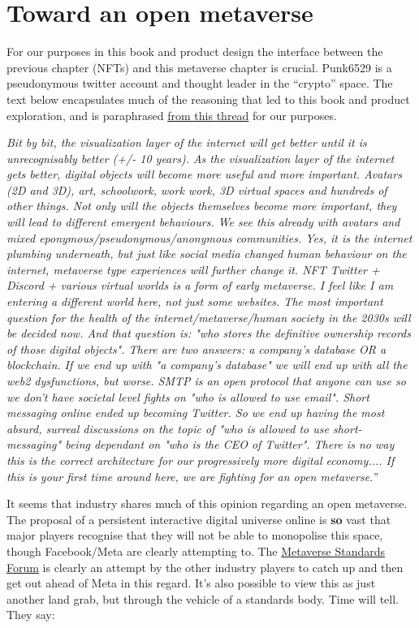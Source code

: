 \section{Toward an open metaverse}
For our purposes in this book and product design the interface between the previous chapter (NFTs) and this metaverse chapter is crucial. Punk6529 is a pseudonymous twitter account and thought leader in the ``crypto'' space. The text below encapsulates much of the reasoning that led to this book and product exploration, and is paraphrased \href{https://twitter.com/punk6529/status/1536046831045685248}{from this thread} for our purposes.\par
\textit{Bit by bit, the visualization layer of the internet will get better until it is unrecognisably better (+/- 10 years). As the visualization layer of the internet gets better, digital objects will become more useful and more important. Avatars (2D and 3D), art, schoolwork, work work, 3D virtual spaces and hundreds of other things. Not only will the objects themselves become more important, they will lead to different emergent behaviours. We see this already with avatars and mixed eponymous/pseudonymous/anonymous communities. Yes, it is the internet plumbing underneath, but just like social media changed human behaviour on the internet, metaverse type experiences will further change it. NFT Twitter + Discord + various virtual worlds is a form of early metaverse. I feel like I am entering a different world here, not just some websites. The most important question for the health of the internet/metaverse/human society in the 2030s will be decided now. And that question is: "who stores the definitive ownership records of those digital objects". There are two answers: a company's database OR a blockchain. If we end up with "a company's database" we will end up with all the web2 dysfunctions, but worse. SMTP is an open protocol that anyone can use so we don't have societal level fights on "who is allowed to use email". Short messaging online ended up becoming Twitter. So we end up having the most absurd, surreal discussions on the topic of "who is allowed to use short-messaging" being dependant on "who is the CEO of Twitter". There is no way this is the correct architecture for our progressively more digital economy.... If this is your first time around here, we are fighting for an open metaverse.''}\par
It seems that industry shares much of this opinion regarding an open metaverse. The proposal of a persistent interactive digital universe online is \textbf{so} vast that major players recognise that they will not be able to monopolise this space, though Facebook/Meta are clearly attempting to. The \href{https://metaverse-standards.org/news/press-releases/leading-standards-organizations-and-companies-unite-to-drive-open-metaverse-interoperability/}{Metaverse Standards Forum} is clearly an attempt by the other industry players to catch up and then get out ahead of Meta in this regard. It's also possible to view this as just another land grab, but through the vehicle of a standards body. Time will tell. They say:\par
